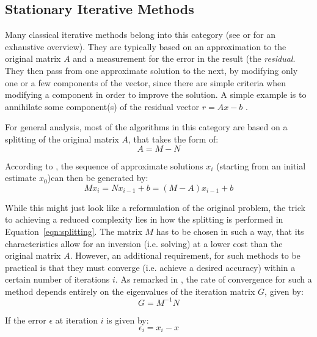 \subsection{Stationary Iterative Methods}
\label{sec:stationary_methods}

Many classical iterative methods belong into this category (see \cite{saad_iterative_2003} or \cite{golub_matrix_2013} for an exhaustive overview). They are typically based on an approximation to the original matrix $A$ and a measurement for the error in the result (the \textit{residual}. They then pass from one approximate solution to the next, by modifying only one or a few components of the vector, since there are simple criteria when modifying a component in order to improve the solution. A simple example is to annihilate some component(s) of the residual vector $r=Ax -b$ \cite{saad_iterative_2003}. 

For general analysis, most of the algorithms in this category are based on a splitting of the original matrix $A$, that takes the form of:
\begin{equation}
\label{eqn:splitting}
    A = M - N
\end{equation}

\noindent According to \cite{golub_matrix_2013}, the sequence of approximate solutions $x_i$ (starting from an initial estimate $x_0$)can then be generated by:
\begin{equation}
    Mx_i = Nx_{i-1} +b = (M-A)x_{i-1}+b
\end{equation}

\noindent While this might just look like a reformulation of the original problem, the trick to achieving a reduced complexity lies in how the splitting is performed in Equation~\hyperref[eqn:splitting]{\ref{eqn:splitting}}. The matrix $M$ has to be chosen in such a way, that its characteristics allow for an inversion (i.e. solving) at a lower cost than the original matrix $A$. However, an additional requirement, for such methods to be practical is that they must converge (i.e. achieve a desired accuracy) within a certain number of iterations $i$. As remarked in \cite{golub_matrix_2013}, the rate of convergence for such a method depends entirely on the eigenvalues of the iteration matrix $G$, given by:
\begin{equation}
    G=M^{-1}N    
\end{equation}

\noindent If the error $\epsilon$ at iteration $i$ is given by:
\begin{equation}
    \epsilon_i = x_i -x
\end{equation}

